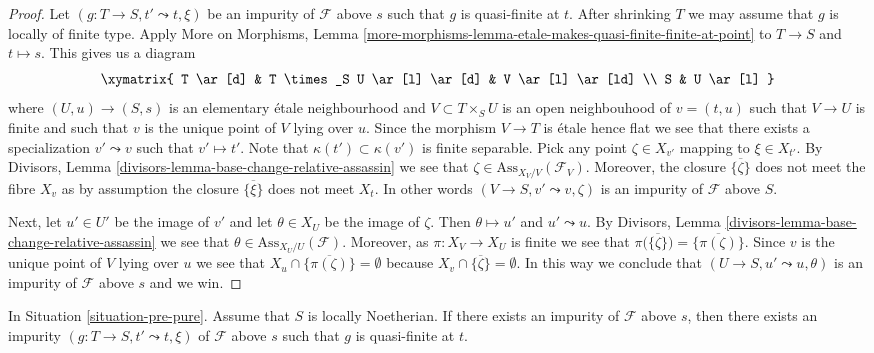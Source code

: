 \begin{proof}
Let $(g : T \to S, t' \leadsto t, \xi)$ be an impurity of
$\mathcal{F}$ above $s$ such that $g$ is quasi-finite at $t$.
After shrinking $T$ we may assume that $g$ is locally of finite type.
Apply
More on Morphisms,
Lemma \ref{more-morphisms-lemma-etale-makes-quasi-finite-finite-at-point}
to $T \to S$ and $t \mapsto s$. This gives us a diagram
$$
\xymatrix{
T \ar[d] & T \times_S U \ar[l] \ar[d] & V \ar[l] \ar[ld] \\
S & U \ar[l]
}
$$
where $(U, u) \to (S, s)$ is an elementary \'etale neighbourhood
and $V \subset T \times_S U$ is an open neighbouhood of $v = (t, u)$
such that $V \to U$ is finite and such that $v$ is the unique point of $V$
lying over $u$. Since the morphism $V \to T$ is \'etale
hence flat we see that there exists a specialization $v' \leadsto v$ such
that $v' \mapsto t'$. Note that $\kappa(t') \subset \kappa(v')$
is finite separable. Pick any point $\zeta \in X_{v'}$ mapping to
$\xi \in X_{t'}$. By
Divisors, Lemma \ref{divisors-lemma-base-change-relative-assassin}
we see that $\zeta \in \text{Ass}_{X_V/V}(\mathcal{F}_V)$.
Moreover, the closure $\overline{\{\zeta\}}$ does not meet
the fibre $X_v$ as by assumption the closure $\overline{\{\xi\}}$
does not meet $X_t$. In other words $(V \to S, v' \leadsto v, \zeta)$
is an impurity of $\mathcal{F}$ above $S$.

\medskip\noindent
Next, let $u' \in U'$ be the image of $v'$ and let
$\theta \in X_U$ be the image of $\zeta$.
Then $\theta \mapsto u'$ and $u' \leadsto u$.
By
Divisors, Lemma \ref{divisors-lemma-base-change-relative-assassin}
we see that $\theta \in \text{Ass}_{X_U/U}(\mathcal{F})$.
Moreover, as $\pi : X_V \to X_U$ is finite we see that
$\pi\big(\overline{\{\zeta\}}\big) = \overline{\{\pi(\zeta)\}}$. Since
$v$ is the unique point of $V$ lying over $u$ we see that
$X_u \cap \overline{\{\pi(\zeta)\}} = \emptyset$ because
$X_v \cap \overline{\{\zeta\}} = \emptyset$. In this way we conclude that
$(U \to S, u' \leadsto u, \theta)$ is an impurity of
$\mathcal{F}$ above $s$ and we win.
\end{proof}

\begin{lemma}
\label{lemma-Noetherian-impurity-quasi-finite}
In Situation \ref{situation-pre-pure}.
Assume that $S$ is locally Noetherian.
If there exists an impurity of $\mathcal{F}$ above $s$, then
there exists an impurity $(g : T \to S, t' \leadsto t, \xi)$
of $\mathcal{F}$ above $s$ such that $g$ is quasi-finite at $t$.
\end{lemma}

